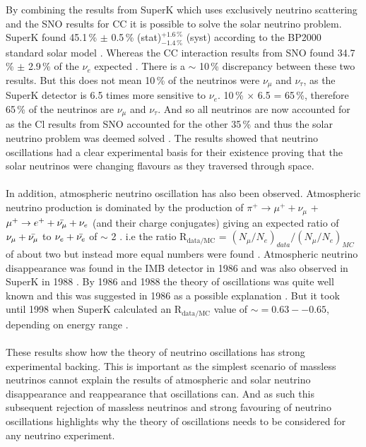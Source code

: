 \\\\By combining the results from SuperK which uses exclusively neutrino scattering and the SNO results for CC it is possible to solve the solar neutrino problem. SuperK found 45.1\,\% $\pm$ 0.5\,\% (stat)$^{+1.6\,\%}_{-1.4\,\%}$ (syst) according to the BP2000 standard solar model \cite{superK2001}. Whereas the CC interaction results from SNO found 34.7\,\% $\pm$ 2.9\,\% of the $\nu_e$ expected \cite{sno2001}. There is a $\sim$ 10\,\% discrepancy between these two results. But this does not mean 10\,\% of the neutrinos were $\nu_\mu$ and $\nu_\tau$, as the SuperK detector is 6.5 times more sensitive to $\nu_e$. 10\,\% $\times$ 6.5 = 65\,\%, therefore 65\,\% of the neutrinos are $\nu_\mu$ and $\nu_\tau$. And so all neutrinos are now accounted for as the Cl results from SNO accounted for the other 35\,\% and thus the solar neutrino problem was deemed solved  \cite{griffiths2008neutrinoOscillations}. The results showed that neutrino oscillations had a clear experimental basis for their existence proving that the solar neutrinos were changing flavours as they traversed through space. 
\\\\In addition, atmospheric neutrino oscillation has also been observed. Atmospheric neutrino production is dominated by the production of $\pi^+ \rightarrow \mu^+ + \nu_\mu$ + $\mu^+ \rightarrow e^+ + \Bar{\nu_\mu} + \nu_e$ (and their charge conjugates) giving an expected ratio of $\nu_\mu + \Bar{\nu_\mu}$ to $\nu_e + \Bar{\nu_e}$ of $\sim$ 2 \cite{fukuda_skAtmosAnnounce_1998}. i.e the ratio R$_{\textrm{data}/\textrm{MC}}$ = $(N_\mu/N_e)_{data}/(N_\mu/N_e)_{MC}$ of about two but instead more equal numbers were found \cite{fukuda_skAtmosAnnounce_1998} \cite{KAJITA_sk_atmospheric_2016}. Atmospheric neutrino disappearance was found in the IMB detector in 1986 \cite{tjHaines_AtmosModel_1986} and was also observed in SuperK in 1988 \cite{Hirata_sk_atmosStudy_1988} \cite{KAJITA_sk_atmospheric_2016}. By 1986 and 1988 the theory of oscillations was quite well known and this was suggested in 1986 as a possible explanation \cite{tjHaines_AtmosModel_1986}. But it took until 1998 when SuperK calculated an R$_{\textrm{data}/\textrm{MC}}$ value of $\sim = 0.63 -- 0.65$, depending on energy range \cite{fukuda_skAtmosAnnounce_1998}. 
\\\\These results show how the theory of neutrino oscillations has strong experimental backing. This is important as the simplest scenario of massless neutrinos cannot explain the results of atmospheric and solar neutrino disappearance and reappearance that oscillations can. And as such this subsequent rejection of massless neutrinos and strong favouring of neutrino oscillations highlights why the theory of oscillations needs to be considered for any neutrino experiment. 

